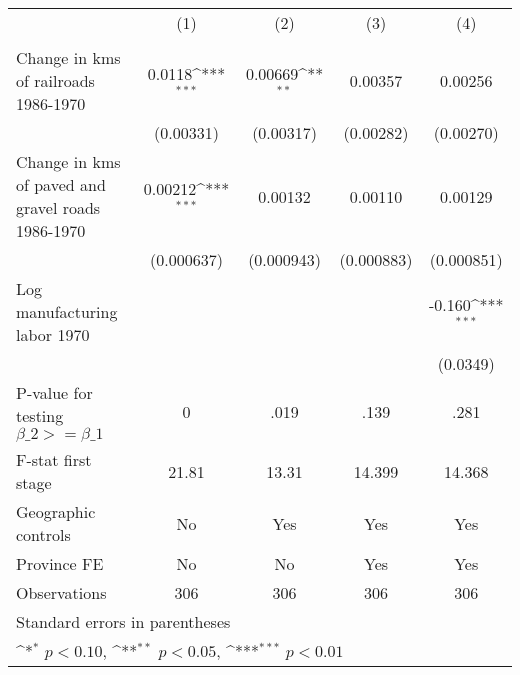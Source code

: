 {
\def\sym#1{\ifmmode^{#1}\else\(^{#1}\)\fi}
\begin{tabular}{l*{4}{c}}
\hline\hline
                &\multicolumn{1}{c}{(1)}&\multicolumn{1}{c}{(2)}&\multicolumn{1}{c}{(3)}&\multicolumn{1}{c}{(4)}\\
                &\multicolumn{1}{c}{}&\multicolumn{1}{c}{}&\multicolumn{1}{c}{}&\multicolumn{1}{c}{}\\
\hline
Change in kms of railroads 1986-1970&   0.0118\sym{***}&  0.00669\sym{**} &  0.00357         &  0.00256         \\
                &(0.00331)         &(0.00317)         &(0.00282)         &(0.00270)         \\
[1em]
Change in kms of paved and gravel roads 1986-1970&  0.00212\sym{***}&  0.00132         &  0.00110         &  0.00129         \\
                &(0.000637)         &(0.000943)         &(0.000883)         &(0.000851)         \\
[1em]
Log manufacturing labor 1970&                  &                  &                  &   -0.160\sym{***}\\
                &                  &                  &                  & (0.0349)         \\
\hline
P-value for testing $\beta\_{2} >= \beta\_{1}$&        0         &     .019         &     .139         &     .281         \\
F-stat first stage&    21.81         &    13.31         &   14.399         &   14.368         \\
Geographic controls&       No         &      Yes         &      Yes         &      Yes         \\
Province FE     &       No         &       No         &      Yes         &      Yes         \\
Observations    &      306         &      306         &      306         &      306         \\
\hline\hline
\multicolumn{5}{l}{\footnotesize Standard errors in parentheses}\\
\multicolumn{5}{l}{\footnotesize \sym{*} \(p<0.10\), \sym{**} \(p<0.05\), \sym{***} \(p<0.01\)}\\
\end{tabular}
}
